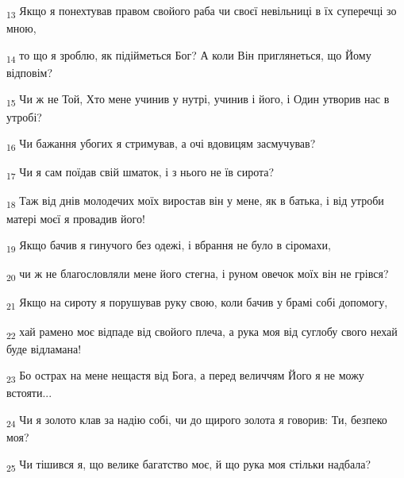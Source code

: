 \begin{tcolorbox}
\textsubscript{13} Якщо я понехтував правом свойого раба чи своєї невільниці в їх суперечці зо мною,
\end{tcolorbox}
\begin{tcolorbox}
\textsubscript{14} то що я зроблю, як підійметься Бог? А коли Він приглянеться, що Йому відповім?
\end{tcolorbox}
\begin{tcolorbox}
\textsubscript{15} Чи ж не Той, Хто мене учинив у нутрі, учинив і його, і Один утворив нас в утробі?
\end{tcolorbox}
\begin{tcolorbox}
\textsubscript{16} Чи бажання убогих я стримував, а очі вдовицям засмучував?
\end{tcolorbox}
\begin{tcolorbox}
\textsubscript{17} Чи я сам поїдав свій шматок, і з нього не їв сирота?
\end{tcolorbox}
\begin{tcolorbox}
\textsubscript{18} Таж від днів молодечих моїх виростав він у мене, як в батька, і від утроби матері моєї я провадив його!
\end{tcolorbox}
\begin{tcolorbox}
\textsubscript{19} Якщо бачив я гинучого без одежі, і вбрання не було в сіромахи,
\end{tcolorbox}
\begin{tcolorbox}
\textsubscript{20} чи ж не благословляли мене його стегна, і руном овечок моїх він не грівся?
\end{tcolorbox}
\begin{tcolorbox}
\textsubscript{21} Якщо на сироту я порушував руку свою, коли бачив у брамі собі допомогу,
\end{tcolorbox}
\begin{tcolorbox}
\textsubscript{22} хай рамено моє відпаде від свойого плеча, а рука моя від суглобу свого нехай буде відламана!
\end{tcolorbox}
\begin{tcolorbox}
\textsubscript{23} Бо острах на мене нещастя від Бога, а перед величчям Його я не можу встояти...
\end{tcolorbox}
\begin{tcolorbox}
\textsubscript{24} Чи я золото клав за надію собі, чи до щирого золота я говорив: Ти, безпеко моя?
\end{tcolorbox}
\begin{tcolorbox}
\textsubscript{25} Чи тішився я, що велике багатство моє, й що рука моя стільки надбала?
\end{tcolorbox}
